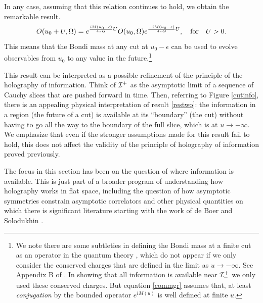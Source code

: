 \documentclass[12pt]{article}
\def\gnewt{G}
\newcommand{\be}{\begin{equation}}
\newcommand{\ee}{\end{equation}}
\def \sph{{\Omega}}
\def \scrip{{\cal I}^{+}}
\def \scrippast{{\cal I}^{+}_{-}}
\begin{document}
In any case, assuming that this relation continues to hold,  we obtain the remarkable result.
\be
\label{restwo}
O(u_0 + U, \sph) = e^{{i M(u_0 - \epsilon) \over 4 \pi \gnewt}  U} O(u_0, \sph) e^{{-i M (u_0 - \epsilon) \over 4 \pi \gnewt} U}, ~~~\text{for}~~~ U> 0.
\ee
This means that the Bondi mass at any cut at $u_0 - \epsilon$ can be used to evolve observables from $u_0$ to any value in the future.\footnote{We note there are some subtleties in defining the Bondi mass at a finite cut as an operator in the quantum theory \cite{Bousso:2017xyo}, which do not appear if we only consider the conserved charges that are defined in the limit as $u \rightarrow -\infty$. See Appendix B of \cite{Laddha:2020kvp}.  In showing that all information is available near $\scrippast$ we only used these conserved charges.  But equation \eqref{commgr} assumes that, at least {\em conjugation} by the bounded operator $e^{i M(u)}$  is well defined at finite $u$.}




This result can be interpreted as a possible refinement of the principle of the holography of information.  Think of $\scrip$ as the asymptotic limit of a sequence of Cauchy slices that are pushed forward in time.  Then, referring to Figure \ref{cutinfo}, there is an appealing physical interpretation of result \ref{restwo}: the information in a region (the future of a cut) is available at its ``boundary'' (the cut) without having to go all the way to the boundary of the full slice, which is at $u \rightarrow -\infty$.  We emphasize that even if the stronger assumptions made for this result fail to hold, this does not affect the validity of the principle of holography of information proved previously.


The focus in this section has been on the question of where information is available. This is just part of a broader program of understanding how holography works in flat space, including the question of how asymptotic symmetries constrain asymptotic correlators and other physical quantities \cite{Bagchi:2012cy,Bagchi:2010eg,Bagchi:2014iea,Banerjee:2019prz,Pasterski:2016qvg,He:2017fsb,Mishra:2017zan} on which there is significant literature starting with the work of de Boer and Solodukhin \cite{deBoer:2003vf}.
\end{document}
